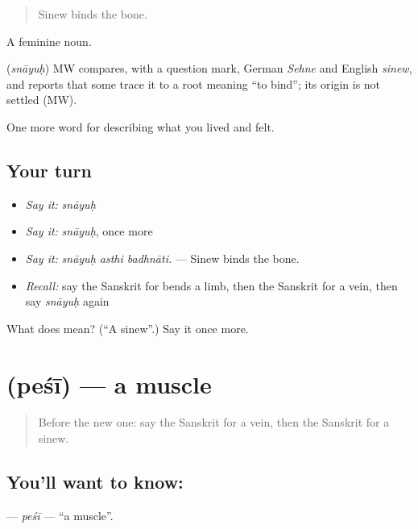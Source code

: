\begin{quote}
Sinew binds the bone.
\end{quote}

A feminine noun.

\begin{cousinweb}
\textbf{} (\emph{snāyuḥ}) MW compares, with a question mark, German \emph{Sehne} and English \emph{sinew}, and reports that some trace it to a root meaning \textquotedblleft{}to bind\textquotedblright{}; its origin is not settled (MW).
\end{cousinweb}

\begin{grammarlens}[title={What you've built}]
One more word for describing what you lived and felt.
\end{grammarlens}

\subsection*{Your turn}
\begin{itemize}
\raggedright
  \item \emph{Say it:} \emph{snāyuḥ}
  \item \emph{Say it:} \emph{snāyuḥ}, once more
  \item \emph{Say it:} \emph{snāyuḥ asthi badhnāti.} — Sinew binds the bone.
  \item \emph{Recall:} say the Sanskrit for bends a limb, then the Sanskrit for a vein, then say \emph{snāyuḥ} again
\end{itemize}

\begin{tcolorbox}[breakable,colback=teal!4,colframe=teal!35!black,title={Before you move on}]
What does  mean? (\textquotedblleft{}A sinew\textquotedblright{}.) Say it once more.
\end{tcolorbox}
\section[\texorpdfstring{\sk{पेशी} (peśī)}{पेशी (peśī)}]{ (peśī) — a muscle}

\label{lesson:SA-C474-pesi}



\begin{quote}
Before the new one: say the Sanskrit for a vein, then the Sanskrit for a sinew.
\end{quote}

\subsection*{You'll want to know: }
\textbf{} — \emph{peśī} — \textquotedblleft{}a muscle\textquotedblright{}.

